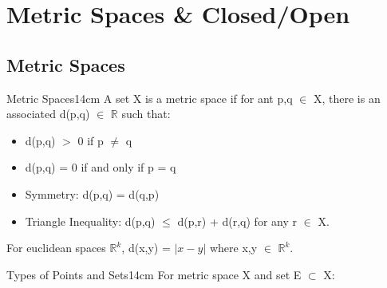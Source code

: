 \newpage

\section[Day 5: Metric Spaces and Closed/Open]{ Metric Spaces \& Closed/Open }

\subsection{ Metric Spaces }

	\begin{definition}{Metric Spaces}{14cm}
		A set X is a metric space if for ant p,q $\in$ X,
		there is an associated d(p,q) $\in$ $\mathbb{R}$ such that:

		\begin{itemize}[leftmargin=1cm, itemsep=0.1cm]
			\item d(p,q) $>$ 0 \hspace{1cm} if p $\neq$ q
			
			\item d(p,q) = 0 if and only if p = q
			
			\item {\color{lblue} Symmetry}:
				d(p,q) = d(q,p)
			
			\item {\color{lblue} Triangle Inequality}:
				d(p,q) $\leq$ d(p,r) + d(r,q)
				\hspace{1cm}
				for any r $\in$ X.
		\end{itemize}

		For euclidean spaces $\mathbb{R}^k$,
		d(x,y) = $| x - y |$ where x,y $\in$ $\mathbb{R}^k$.
	\end{definition}

	\vspace{0.5cm}



	\begin{definition}{Types of Points and Sets}{14cm}
		For metric space X and set E $\subset$ X:
	\end{definition}
	
